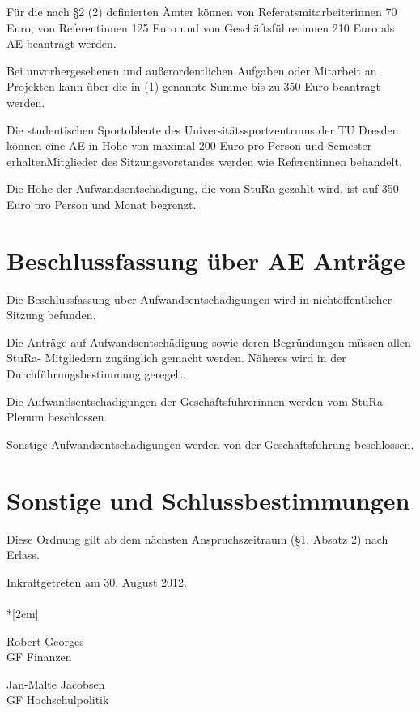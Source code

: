 \begin{multicols}{2}
\Abs \Satz Für die nach §2 (2) definierten Ämter können von Referatsmitarbeiterinnen 70 Euro, von Referentinnen 125 Euro und von Geschäftsführerinnen 210 Euro als AE beantragt werden.

\Abs \Satz Bei unvorhergesehenen und außerordentlichen Aufgaben oder Mitarbeit an Projekten kann über die in (1) genannte Summe bis zu 350 Euro beantragt werden.

\Abs \Satz  Die studentischen Sportobleute des Universitätssportzentrums der TU Dresden können eine AE in Höhe von maximal 200 Euro pro Person und Semester erhalten\. Mitglieder des Sitzungsvorstandes werden wie Referentinnen behandelt.

\Abs \Satz Die Höhe der Aufwandsentschädigung, die vom StuRa gezahlt wird, ist auf 350 Euro pro Person und Monat begrenzt. 

\section{Beschlussfassung über AE Anträge}

\Abs \Satz Die Beschlussfassung über Aufwandsentschädigungen wird in nichtöffentlicher Sitzung befunden.

\Abs \Satz Die Anträge auf Aufwandsentschädigung sowie deren Begründungen müssen allen StuRa- Mitgliedern zugänglich gemacht werden. Näheres wird in der Durchführungsbestimmung geregelt.

\Abs \Satz Die Aufwandsentschädigungen der Geschäftsführerinnen werden vom StuRa-Plenum beschlossen.

\Abs \Satz Sonstige Aufwandsentschädigungen werden von der Geschäftsführung beschlossen.


\section{Sonstige und Schlussbestimmungen}

\Abs \Satz Diese Ordnung gilt ab dem nächsten Anspruchszeitraum (§1, Absatz 2) nach Erlass.

\end{multicols}

\nopagebreak
\vspace{1cm}

\footnotesize
Inkraftgetreten am 30. August 2012.\\


\normalsize
~\\*[2cm]
\begin{center}
\hspace*{\fill}
\parbox{7cm}{Robert Georges\\GF Finanzen}
\hfill\parbox{7cm}{Jan-Malte Jacobsen \\GF Hochschulpolitik}
\hspace*{\fill}
\end{center}
